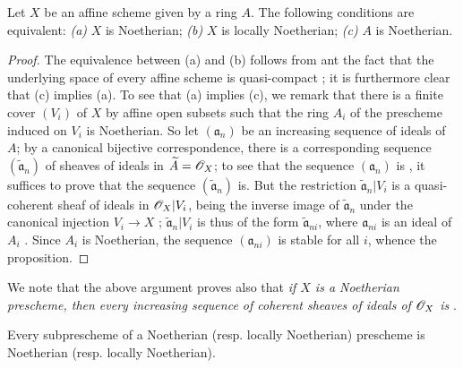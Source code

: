 \begin{proposition}[6.1.3]
\label{I.6.1.3}
Let $X$ be an affine scheme given by a ring $A$.
The following conditions are equivalent:
\emph{(a)} $X$ is Noetherian;
\emph{(b)} $X$ is locally Noetherian;
\emph{(c)} $A$ is Noetherian.
\end{proposition}

\begin{proof}
\label{proof-1.6.1.3}
The equivalence between (a) and (b) follows from  ant the fact that the underlying space of every affine scheme is quasi-compact ; it is furthermore clear that (c) implies (a).
To see that (a) implies (c), we remark that there is a finite cover $(V_i)$ of $X$ by affine open subsets such that the ring $A_i$ of the prescheme induced on $V_i$ is Noetherian.
So let $(\mathfrak{a}_n)$ be an increasing sequence of ideals of $A$; by a canonical bijective correspondence, there is a corresponding sequence $(\widetilde{\mathfrak{a}}_n)$ of sheaves of ideals in $\widetilde{A}=\mathscr{O}_X$;
to see that the sequence $(\mathfrak{a}_n)$ is , it suffices to prove that the sequence $(\widetilde{\mathfrak{a}}_n)$ is.
But the restriction $\widetilde{\mathfrak{a}}_n|V_i$ is a quasi-coherent sheaf of ideals in $\mathscr{O}_X|V_i$, being the inverse image of $\widetilde{\mathfrak{a}}_n$ under the canonical injection $V_i\to X$ ;
$\widetilde{\mathfrak{a}}_n|V_i$ is thus of the form $\widetilde{\mathfrak{a}}_{ni}$, where $\mathfrak{a}_{ni}$ is an ideal of $A_i$ .
Since $A_i$ is Noetherian, the sequence $(\mathfrak{a}_{ni})$ is stable for all $i$, whence the proposition.
\end{proof}

We note that the above argument proves also that \emph{if $X$ is a Noetherian prescheme, then every increasing sequence of coherent sheaves of ideals of $\mathscr{O}_X$ is }.

\begin{proposition}[6.1.4]
\label{I.6.1.4}
Every subprescheme of a Noetherian (resp. locally Noetherian) prescheme is Noetherian (resp. locally Noetherian).
\end{proposition}

